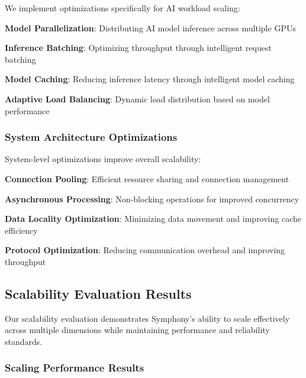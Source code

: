 We implement optimizations specifically for AI workload scaling:

\begin{expandedlist}
    \item \textbf{Model Parallelization}: Distributing AI model inference across multiple GPUs
    \item \textbf{Inference Batching}: Optimizing throughput through intelligent request batching
    \item \textbf{Model Caching}: Reducing inference latency through intelligent model caching
    \item \textbf{Adaptive Load Balancing}: Dynamic load distribution based on model performance
\end{expandedlist}

\subsubsection*{System Architecture Optimizations}

System-level optimizations improve overall scalability:

\begin{compactlist}
    \item \textbf{Connection Pooling}: Efficient resource sharing and connection management
    \item \textbf{Asynchronous Processing}: Non-blocking operations for improved concurrency
    \item \textbf{Data Locality Optimization}: Minimizing data movement and improving cache efficiency
    \item \textbf{Protocol Optimization}: Reducing communication overhead and improving throughput
\end{compactlist}

\subsection*{Scalability Evaluation Results}

Our scalability evaluation demonstrates Symphony's ability to scale effectively across multiple dimensions while maintaining performance and reliability standards.

\subsubsection*{Scaling Performance Results}

